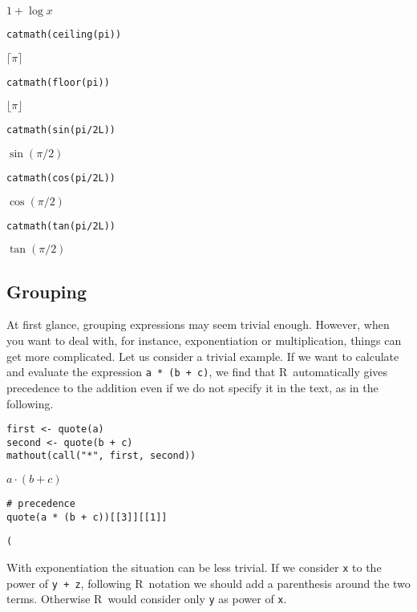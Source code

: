 \({{1}+{\log{x}}}\)

\begin{verbatim}
catmath(ceiling(pi))
\end{verbatim}

\({\lceil\pi\rceil}\)

\begin{verbatim}
catmath(floor(pi))
\end{verbatim}

\({\lfloor\pi\rfloor}\)

\begin{verbatim}
catmath(sin(pi/2L))
\end{verbatim}

\({\sin\left({\pi/{2}}\right)}\)

\begin{verbatim}
catmath(cos(pi/2L))
\end{verbatim}

\({\cos\left({\pi/{2}}\right)}\)

\begin{verbatim}
catmath(tan(pi/2L))
\end{verbatim}

\({\tan\left({\pi/{2}}\right)}\)

\hypertarget{grouping}{%
\subsection{Grouping}\label{grouping}}

At first glance, grouping expressions may seem trivial enough. However, when you want to deal with, for instance, exponentiation or multiplication, things can get more complicated. Let us consider a trivial example. If we want to calculate and evaluate the expression \texttt{a\ *\ (b\ +\ c)}, we find that R~automatically gives precedence to the addition even if we do not specify it in the text, as in the following.

\begin{verbatim}
first <- quote(a)
second <- quote(b + c)
mathout(call("*", first, second))
\end{verbatim}

\({{a}\cdot\left({{b}+{c}}\right)}\)

\begin{verbatim}
# precedence
quote(a * (b + c))[[3]][[1]]
\end{verbatim}

\texttt{(}

With exponentiation the situation can be less trivial. If we consider \texttt{x} to the power of \texttt{y\ +\ z}, following R~notation we should add a parenthesis around the two terms. Otherwise R~would consider only \texttt{y} as power of \texttt{x}.

